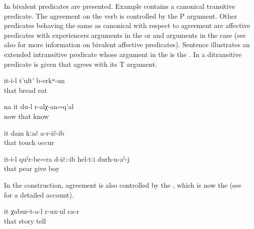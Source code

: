 In  bivalent predicates are presented. Example  contains a canonical transitive predicate. The agreement on the verb is controlled by the P argument. Other predicates behaving the same as canonical  with respect to agreement are affective predicates with experiencers arguments in the  or  and  arguments in the  case  (see also  for more information on bivalent affective predicates). Sentence  illustrates an extended intransitive predicate whose argument in the  is the . In  a ditransitive predicate is given that agrees with its T argument.
%
\begin{exe}
		\ex	\label{ex:S/he ate bread@13a}
		\gll	it-i-l	t'ult'	b-erkʷ-un\\
			that	bread	eat\\
		\glt	{}

		\ex	\label{ex:Well, I must know her}
		\gll	na	it	du-l	r-alχ-an=q'al\\	
			now	that		know\\
		\glt	{}

		\ex	\label{ex:She did not touch me@8a}
		\gll	it	dam	kːač a-r-ič-ib\\	
			that		touch occur\\
		\glt	{}

		\ex	\label{ex:He gave pears to the boys@8b}
		\gll	it-i-l	quˁr-be=ra	d-ičː-ib	hel-tːi	durħ-n-aˁ-j\\
			that	pear	give		boy\\
		\glt	{}
\end{exe}

In the  construction, agreement is also controlled by the , which is now the   (see  for a detailed account).
%
\begin{exe}
	\ex	\label{ex:‎‎She is telling stories}
	\gll	it	χabur-t-a-l	r-ux-ul	ca-r\\
		that	story	tell	\\
	\glt	{}
\end{exe}

